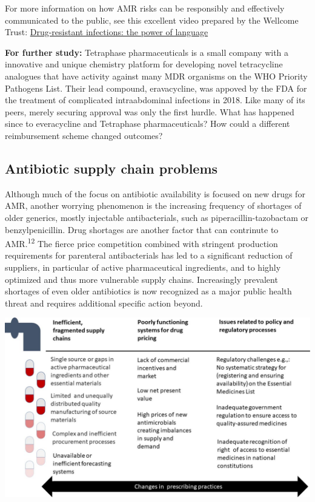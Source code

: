 \documentclass[
]{book}
\begin{document}
For more information on how AMR risks can be responsibly and effectively communicated to the public, see this excellent video prepared by the Wellcome Trust: \href{https://www.youtube.com/watch?v=wTgRpOIxNG0\&t=6s}{Drug-resistant infections: the power of language}

\textbf{For further study:} Tetraphase pharmaceuticals is a small company with a innovative and unique chemistry platform for developing novel tetracycline analogues that have activity against many MDR organisms on the WHO Priority Pathogens List. Their lead compound, eravacycline, was appoved by the FDA for the treatment of complicated intraabdominal infections in 2018. Like many of its peers, merely securing approval was only the first hurdle. What has happened since to everacycline and Tetraphase pharmaceuticals? How could a different reimbursement scheme changed outcomes?

\hypertarget{antibiotic-supply-chain-problems}{%
\subsection*{Antibiotic supply chain problems}\label{antibiotic-supply-chain-problems}}

Although much of the focus on antibiotic availability is focused on new drugs for AMR, another worrying phenomenon is the increasing frequency of shortages of older generics, mostly injectable antibacterials, such as piperacillin-tazobactam or benzylpenicillin. Drug shortages are another factor that can contrinute to AMR.\textsuperscript{12} The fierce price competition combined with stringent production requirements for parenteral antibacterials has led to a significant reduction of suppliers, in particular of active pharmaceutical ingredients, and to highly optimized and thus more vulnerable supply chains. Increasingly prevalent shortages of even older antibiotics is now recognized as a major public health threat and requires additional specific action beyond.

\includegraphics[width=8.33333in,height=\textheight]{images/drugshortages.jpg}
\end{document}
